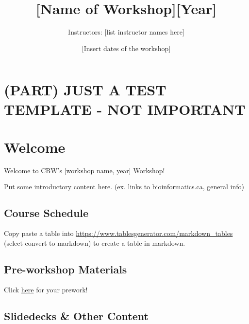 \documentclass[
]{book}
\title{{[}Name of Workshop{]}{[}Year{]}}
\author{Instructors: {[}list instructor names here{]}}
\date{{[}Insert dates of the workshop{]}}
\begin{document}
\maketitle

{
\setcounter{tocdepth}{1}
\tableofcontents
}
\chapter{(PART) JUST A TEST TEMPLATE - NOT IMPORTANT}\label{part-just-a-test-template---not-important}

\chapter{Welcome}\label{welcome}

Welcome to CBW's {[}workshop name, year{]} Workshop!

Put some introductory content here. (ex. links to bioinformatics.ca, general info)

\section{Course Schedule}\label{course-schedule}

Copy paste a table into \url{https://www.tablesgenerator.com/markdown_tables} (select convert to markdown) to create a table in markdown.

\section{Pre-workshop Materials}\label{pre-workshop-materials}

Click \href{insert\%20link\%20here}{here} for your prework!

\section{Slidedecks \& Other Content}\label{slidedecks-other-content}
\end{document}

